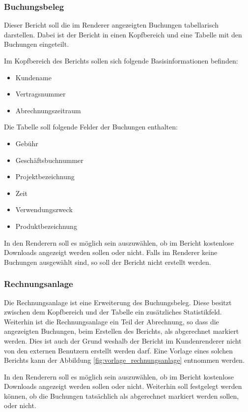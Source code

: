 \subsubsection{Buchungsbeleg}
Dieser Bericht soll die im Renderer angezeigten Buchungen tabellarisch darstellen.
Dabei ist der Bericht in einen Kopfbereich und eine Tabelle mit den Buchungen eingeteilt.

Im Kopfbereich des Berichts sollen sich folgende Basisinformationen befinden:
\begin{itemize}
  \item Kundename 
  \item Vertragsnummer
  \item Abrechnungszeitraum
\end{itemize}  
Die Tabelle soll folgende Felder der Buchungen enthalten: 
\begin{itemize}
 \item Gebühr
 \item Geschäftsbuchnummer 
 \item Projektbezeichnung
 \item Zeit
 \item Verwendungszweck
 \item Produktbezeichnung
\end{itemize}

In den Renderern soll es möglich sein auszuwählen, ob im Bericht kostenlose Downloads angezeigt werden sollen oder nicht.
Falls im Renderer keine Buchungen ausgewählt sind, so soll der Bericht nicht erstellt werden.

\subsubsection{Rechnungsanlage}
Die Rechnungsanlage ist eine Erweiterung des Buchungsbeleg.
Diese besitzt zwischen dem Kopfbereich und der Tabelle ein zusätzliches Statistikfeld.
Weiterhin ist die Rechnungsanlage ein Teil der Abrechnung, so dass die angezeigten Buchungen, beim Erstellen des Berichts, als abgerechnet markiert werden. Dies ist auch der Grund weshalb der Bericht im Kundenrenderer nicht von den externen Benutzern erstellt werden darf.
Eine Vorlage eines solchen Berichts kann der Abbildung \vref{fig:vorlage_rechnungsanlage} entnommen werden.

In den Renderern soll es möglich sein auszuwählen, ob im Bericht kostenlose Downloads angezeigt werden sollen oder nicht. Weiterhin soll festgelegt werden können, ob die Buchungen tatsächlich als abgerechnet markiert werden sollen, oder nicht.

